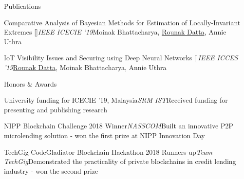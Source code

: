 \documentclass{resume}
\begin{document}
    \begin{rSection}{Publications}
      \begin{rEmptySubsection}{Comparative Analysis of Bayesian Methods for Estimation of Locally-Invariant\\Extremes [\href{https://www.researchgate.net/publication/335985085_Comparative_Analysis_of_Bayesian_Methods_for_Estimation_of_Locally-Invariant_Extremes}{}]}{\textit{IEEE ICECIE '19}}{Moinak Bhattacharya, \underline{Rounak Datta}, Annie Uthra}{~}
      \end{rEmptySubsection}

      \begin{rEmptySubsection}{IoT Visibility Issues and Securing using Deep Neural Networks [\href{https://www.researchgate.net/publication/336057690_IoT_Visibility_Issues_and_Securing_using_Deep_Neural_Networks}{}]}{\textit{IEEE ICCES '19}}{\underline{Rounak Datta}, Moinak Bhattacharya, Annie Uthra}{~}
      \end{rEmptySubsection}

    \end{rSection}

    \begin{rSection}{Honors \& Awards}
      \begin{rEmptySubsection}{University funding for ICECIE '19, Malaysia}{\textit{SRM IST}}{Received funding for presenting and publishing research}{~}
      \end{rEmptySubsection}

      \begin{rEmptySubsection}{NIPP Blockchain Challenge 2018 Winner}{\textit{NASSCOM}}{Built an innovative P2P microlending solution - won the first prize at NIPP Innovation Day}{~}
      \end{rEmptySubsection}

      \begin{rEmptySubsection}{TechGig CodeGladiator Blockchain Hackathon 2018 Runners-up}{\textit{Team TechGig}}{Demonstrated the practicality of private blockchains in credit lending industry - won the second prize}{~}
      \end{rEmptySubsection}

    \end{rSection}
\end{document}
